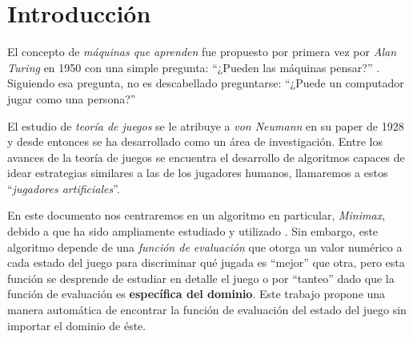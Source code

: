 \section{Introducción}
  El concepto de \textit{máquinas que aprenden} fue propuesto por primera vez por \textit{Alan 
  Turing} en 1950 con una simple pregunta: \enquote{¿Pueden las máquinas pensar?} 
  \autocite{turingCOMPUTINGMACHINERYINTELLIGENCE1950}.
  Siguiendo esa pregunta, no es descabellado preguntarse: \enquote{¿Puede un computador jugar como 
  una persona?}

  El estudio de \textit{teoría de juegos} se le atribuye a \textit{von Neumann} en su paper de 
  1928 \autocite{v.neumannZurTheorieGesellschaftsspiele1928} y desde entonces se ha desarrollado como un área de investigación.
  Entre los avances de la teoría de juegos se encuentra el desarrollo de algoritmos capaces de 
  idear estrategias similares a las de los jugadores humanos, llamaremos a estos 
  \enquote{\textit{jugadores artificiales}}.

  En este documento nos centraremos en un algoritmo en particular, \textit{Minimax}, debido a que ha
  sido ampliamente estudiado y utilizado \autocite{v.neumannZurTheorieGesellschaftsspiele1928,
  fanMinimaxTheorems1953,maschlerGameTheory2013,thekumparampilEfficientAlgorithmsSmooth2019,
  Minimax2022}.
  Sin embargo, este algoritmo depende de una \textit{función de evaluación} que otorga un valor
  numérico a cada estado del juego para discriminar qué jugada es \enquote{mejor} que otra, pero 
  esta función se desprende de estudiar en detalle el juego 
  \autocite{shannonProgrammingComputerPlaying1988a} o por \enquote{tanteo} dado que la función de 
  evaluación es \textbf{específica del dominio}\autocite{dyerCS540Lecture}.
  Este trabajo propone una manera automática de encontrar la función de evaluación del estado del
  juego sin importar el dominio de éste.